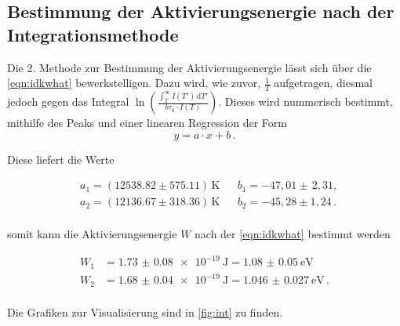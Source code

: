\subsection{Bestimmung der Aktivierungsenergie nach der Integrationsmethode}

Die 2. Methode zur Bestimmung der Aktivierungsenergie lässt sich über die \autoref{eqn:idkwhat} bewerkstelligen. Dazu wird, wie zuvor, $\frac{1}{T}$ aufgetragen, diesmal jedoch gegen
das Integral $\ln\left( \frac{\int_T^\infty I(T') \, \text{d}T'}{b \tau_0 \cdot I(T)}\right)$. Dieses wird nummerisch bestimmt, mithilfe des Peaks und einer linearen Regression 
der Form 
\begin{equation*}
  y = a \cdot x + b \, .
\end{equation*}

\noindent
Diese liefert die Werte 

\begin{align*}
  &a_1 = (12538.82 \pm 575.11)\,\si{\kelvin}  && b_1 = -47,01 \pm  \, 2,31 , \\ 
  &a_2 = (12136.67 \pm 318.36)\,\si{\kelvin} && b_2 = -45,28 \pm 1,24\, . \\ 
\end{align*}

\noindent
somit kann die Aktivierungsenergie $W$ nach der \autoref{eqn:idkwhat} bestimmt werden

\begin{align*}
  W_{1} &= \SI{1.73(8)e-19}{\joule} = \SI{1.08(5)}{\electronvolt} \, \\
  W_{2} &= \SI{1.68(4)e-19}{\joule} = \SI{1.046(27)}{\electronvolt} \, .\\
\end{align*}

\noindent
Die Grafiken zur Visualisierung sind in \autoref{fig:int} zu finden.

